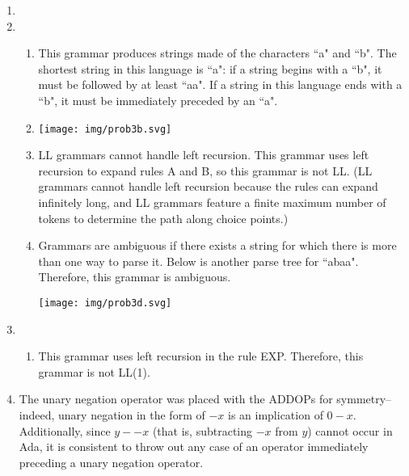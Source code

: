 \documentclass[landscape]{report}
\begin{document}
\begin{enumerate}
    \item %
      
    \item %
    \begin{enumerate}
      \item %
        This grammar produces strings made of the characters ``a" and ``b".
        The shortest string in this language is ``a": if a string begins with a
        ``b", it must be followed by at least ``aa". If a string in this
        language ends with a ``b", it must be immediately preceded by an ``a".
      \item %
        \texttt{[image: img/prob3b.svg]}
      \item %
        LL grammars cannot handle left recursion. This grammar uses left
        recursion to expand rules A and B, so this grammar is not LL. (LL
        grammars cannot handle left recursion because the rules can expand
        infinitely long, and LL grammars feature a finite maximum number of
        tokens to determine the path along choice points.)
      \item %
        Grammars are ambiguous if there exists a string for which there is more
        than one way to parse it. Below is another parse tree for ``abaa".
        Therefore, this grammar is ambiguous.
        
        \texttt{[image: img/prob3d.svg]}
    \end{enumerate}
    \item %
    \begin{enumerate}
      \item %
        This grammar uses left recursion in the rule EXP. Therefore, this
        grammar is not LL(1).
    \end{enumerate}
    \item %
      The unary negation operator was placed with the ADDOPs for symmetry--
      indeed, unary negation in the form of $-x$ is an implication of $0-x$.
      Additionally, since $y--x$ (that is, subtracting $-x$ from $y$) cannot
      occur in Ada, it is consistent to throw out any case of an operator
      immediately preceding a unary negation operator.
      

\end{enumerate}
\end{document}
